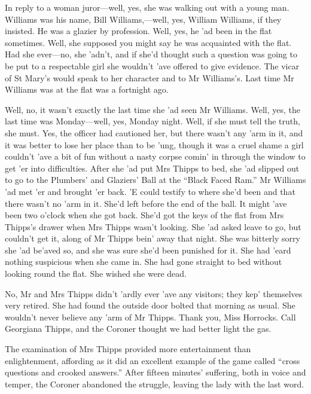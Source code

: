 In reply to a woman juror\allowbreak---\allowbreak well, yes, she was walking out with a young man. Williams was his name, Bill Williams,---well, yes, William Williams, if they insisted. He was a glazier by profession. Well, yes, he ’ad been in the flat sometimes. Well, she supposed you might say he was acquainted with the flat. Had she ever\allowbreak---\allowbreak no, she ’adn’t, and if she’d thought such a question was going to be put to a respectable girl she wouldn’t ’ave offered to give evidence. The vicar of St Mary’s would speak to her character and to Mr Williams’s. Last time Mr Williams was at the flat was a fortnight ago.

Well, no, it wasn’t exactly the last time she ’ad seen Mr Williams. Well, yes, the last time was Monday\allowbreak---\allowbreak well, yes, Monday night. Well, if she must tell the truth, she must. Yes, the officer had cautioned her, but there wasn’t any ’arm in it, and it was better to lose her place than to be ’ung, though it was a cruel shame a girl couldn’t ’ave a bit of fun without a nasty corpse comin’ in through the window to get ’er into difficulties. After she ’ad put Mrs Thipps to bed, she ’ad slipped out to go to the Plumbers’ and Glaziers’ Ball at the \enquote{Black Faced Ram.} Mr Williams ’ad met ’er and brought ’er back. ’E could testify to where she’d been and that there wasn’t no ’arm in it. She’d left before the end of the ball. It might ’ave been two o’clock when she got back. She’d got the keys of the flat from Mrs Thipps’s drawer when Mrs Thipps wasn’t looking. She ’ad asked leave to go, but couldn’t get it, along of Mr Thipps bein’ away that night. She was bitterly sorry she ’ad be’aved so, and she was sure she’d been punished for it. She had ’eard nothing suspicious when she came in. She had gone straight to bed without looking round the flat. She wished she were dead.

No, Mr and Mrs Thipps didn’t ’ardly ever ’ave any visitors; they kep’ themselves very retired. She had found the outside door bolted that morning as usual. She wouldn’t never believe any ’arm of Mr Thipps. Thank you, Miss Horrocks. Call Georgiana Thipps, and the Coroner thought we had better light the gas.

The examination of Mrs Thipps provided more entertainment than enlightenment, affording as it did an excellent example of the game called \enquote{cross questions and crooked answers.} After fifteen minutes’ suffering, both in voice and temper, the Coroner abandoned the struggle, leaving the lady with the last word.

